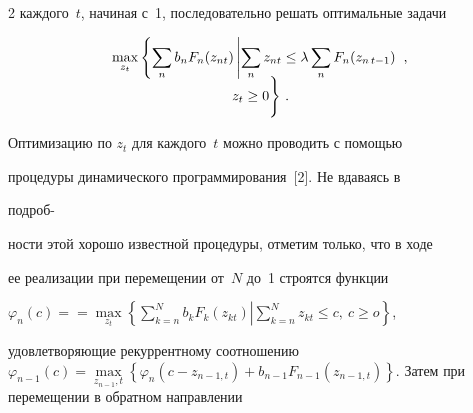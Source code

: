 \begin{multicols}{2}
каж\-до\-го~$t$, начиная с~1, последовательно решать оптимальные задачи 





\vspace*{-6pt}





\noindent


     \begin{multline}


     \underset{z_t}{\max}\left \{ \sum\limits_n b_n F_n(z_{nt})\left\vert 


\sum\limits_n z_{nt}\leq \lambda \sum\limits_n F_n(z_{n\,t-1})\right.\right.\,,\\[-6pt]


\left. \vphantom{\sum\limits_n} z_t\geq 0


\right \}


\,.


     \label{e3.2.3d}


     \end{multline}





Оптимизацию по $z_t$ для каждого~$t$ можно проводить с помощью 


процедуры динамического программирования~[2]. Не вдаваясь в 


подроб-\linebreak\vspace*{-12pt}


\columnbreak





\noindent


ности этой хорошо известной процедуры, отметим только, что в ходе 


ее реализации при перемещении от~$N$ до~1 строятся функции 


$\varphi_n(c)=$\linebreak $=\underset{z_t}{\max} \left \{\sum\limits_{k=n}^N b_k 


F_k(z_{kt})\left\vert \sum\limits_{k=n}^N z_{kt}\right. \leq c,\ c\geq o\right \}$, 


удовле\-творяющие рекуррентному соотношению $\varphi_{n-


1}(c)\!=\!\underset{z_{n-1},t}{\max}\!\left\{\varphi_n(c-z_{n-1,t})+b_{n-1}F_{n-


1}(z_{n-1,t})\right \}$. Затем при перемещении в обратном направлении 



\end{multicols}
